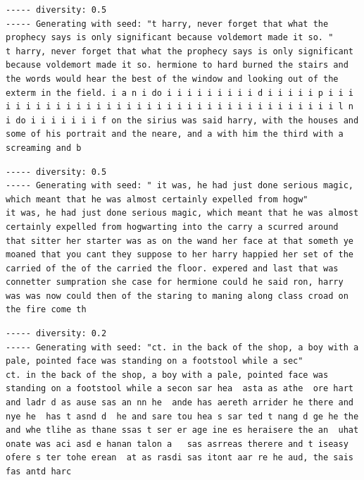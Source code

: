 \documentclass{article}[]
\begin{document}
\begin{lstlisting}[label=harry-adjusted-low-diverse, caption={adjusted original script with Harry Potter after 7 epochs and a diversity of 0.5}]
----- diversity: 0.5
----- Generating with seed: "t harry, never forget that what the prophecy says is only significant because voldemort made it so. "
t harry, never forget that what the prophecy says is only significant because voldemort made it so. hermione to hard burned the stairs and the words would hear the best of the window and looking out of the exterm in the field. i a n i do i i i i i i i i i d i i i i i p i i i i i i i i i i i i i i i i i i i i i i i i i i i i i i i i i i i i l n i do i i i i i i i f on the sirius was said harry, with the houses and some of his portrait and the neare, and a with him the third with a screaming and b
\end{lstlisting}


\begin{lstlisting}[label=harry-gru-low-diverse, caption={script with GRU and with Harry Potter as input after 1 epoch and a diversity of 0.5}]
----- diversity: 0.5
----- Generating with seed: " it was, he had just done serious magic, which meant that he was almost certainly expelled from hogw"
it was, he had just done serious magic, which meant that he was almost certainly expelled from hogwarting into the carry a scurred around that sitter her starter was as on the wand her face at that someth ye moaned that you cant they suppose to her harry happied her set of the carried of the of the carried the floor. expered and last that was connetter sumpration she case for hermione could he said ron, harry was was now could then of the staring to maning along class croad on the fire come th
\end{lstlisting}


\begin{lstlisting}[label=harry-gru-gibberish, caption={script with GRU and with Harry Potter as input after 2 epoch and a diversity of 0.2 and a loss value of arround 2.4}]
----- diversity: 0.2
----- Generating with seed: "ct. in the back of the shop, a boy with a pale, pointed face was standing on a footstool while a sec"
ct. in the back of the shop, a boy with a pale, pointed face was standing on a footstool while a secon sar hea  asta as athe  ore hart and ladr d as ause sas an nn he  ande has aereth arrider he there and nye he  has t asnd d  he and sare tou hea s sar ted t nang d ge he the and whe tlihe as thane ssas t ser er age ine es heraisere the an  uhat onate was aci asd e hanan talon a   sas asrreas therere and t iseasy  ofere s ter tohe erean  at as rasdi sas itont aar re he aud, the sais fas antd harc
\end{lstlisting}

 

\end{document}
